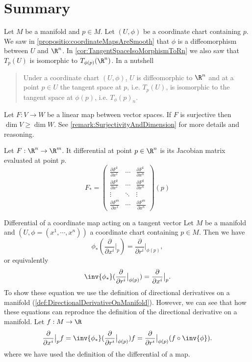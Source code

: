 \newpage


\section{Summary}
\begin{summary}
	Let $ M $ be a manifold and $ p \in M $. Let $ (U,\phi) $ be a coordinate chart containing $ p $. We saw in \autoref{propositio:coordinateMapsAreSmooth} that $ \phi $ is a diffeomorphism between $ U $ and $ \R^n $. In \autoref{cor:TangentSpaceIsoMorphismToRn} we also saw that $ T_p(U) $ is isomorphic to $ T_{\phi(p)}(\R^n) $. In a nutshell
	\begin{quote}
		Under a coordinate chart $ (U,\phi) $, $ U $ is diffeomorphic to $ \R^n $ and at a point $ p \in U $ the tangent space at $ p $, i.e. $ T_p(U) $, is isomorphic to the tangent space at $ \phi(p) $, i.e. $ T_\phi(p)_n $.
	\end{quote}
\end{summary}

\begin{summary}
	Let $ F: V \to W $ be a linear map between vector spaces. If $ F $ is surjective then $ \dim V \geq \dim W $. See \autoref{remark:SurjectivityAndDimension} for more details and reasoning.
\end{summary}


\begin{summary}
	Let $ F: \R^n \to \R^m $. It differential at point $ p \in \R^n $ is its Jacobian matrix evaluated at point $ p $.
	\[ F_* = 
	\begin{pmatrix}
		\frac{\partial F^1}{\partial x^1} & \cdots & \frac{\partial F^1}{\partial x^n} \\
		\frac{\partial F^2}{\partial x^1} & \cdots & \frac{\partial F^2}{\partial x^n} \\
		\vdots & \ddots & \vdots \\
		\frac{\partial F^m}{\partial x^1} & \cdots & \frac{\partial F^m}{\partial x^n}
	\end{pmatrix}(p)
	 \]
\end{summary}

\begin{summary}{Differential of a coordinate map acting on a tangent vector}
	Let $ M $ be a manifold and $ (U,\phi = (x^1,\cdots,x^n)) $ a coordinate chart containing $ p \in M $. Then we have
	\[ \phi_*(\frac{\partial}{\partial  x^i}\big|_{p}) = \frac{\partial}{\partial  r^i}\big|_{\phi(p)} ,\]
	or equivalently
	\[ \inv{\phi_*}(\frac{\partial}{\partial  r^i}\big|_{\phi(p)}) = \frac{\partial}{\partial  x^i}\big|_{p}. \]
	To show these equation we use the definition of directional derivatives on a manifold (\autoref{def:DirectionalDerivativeOnManifold}). However, we can see that how these equations can reproduce the definition of the directional derivative on a manifold. Let $ f:M \to \R $
	\[ \frac{\partial}{\partial  x^i}\big|_{p} f = \inv{\phi_*}(\frac{\partial}{\partial  r^i}\big|_{\phi(p)})f = \frac{\partial}{\partial  r^i}\big|_{\phi(p)}(f\circ\inv{\phi}).  \]
	where we have used the definition of the differential of a map.
\end{summary}

